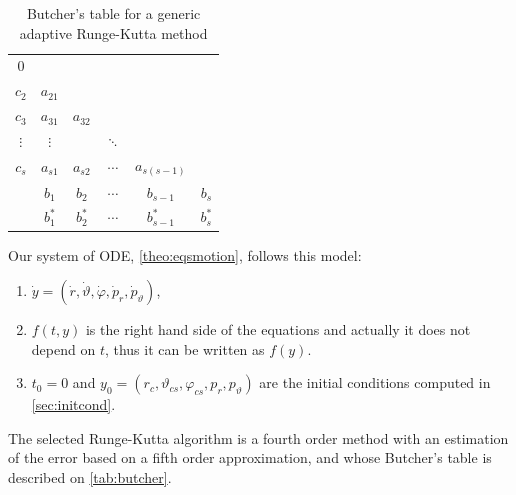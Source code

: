 \begin{table}[bth]
	\myfloatalign
	\begin{tabularx}{.54\textwidth}{c|ccccc}
		$0$&  & & & & \\
		$c_2$& $a_{21}$ & & & & \\
		$c_3$& $a_{31}$ & $a_{32}$ & & & \\
		$\vdots$& $\vdots$ &  & $\ddots$ & & \\
		$c_s$& $a_{s1}$  & $a_{s2}$ & $\cdots$ & $a_{s(s-1)}$ & \\ \hline
		& $b_1$ & $b_2$ & $\cdots$ & $b_{s-1}$ & $b_s$ \\ \hline
		& $b^*_1$ & $b^*_2$ & $\cdots$ & $b^*_{s-1}$ & $b^*_s$ \\
	\end{tabularx}
	\caption{Butcher's table for a generic adaptive Runge-Kutta method}
	\label{tab:generalbutcher}
\end{table}

Our system of \ac{ODE}, \autoref{theo:eqsmotion}, follows this model:
\begin{enumerate}
	\item $\dot{y} = (\dot{r}, \dot{\vartheta}, \dot{\varphi}, \dot{p}_r, \dot{p}_\vartheta)$,
	\item $f(t,y)$ is the right hand side of the equations and actually it does not depend on $t$, thus it can be written as $f(y)$.
	\item $t_0 = 0$ and $y_0 = (r_c, \vartheta_{cs}, \varphi_{cs}, p_{r}, p_{\vartheta})$ are the initial conditions computed in \autoref{sec:initcond}.
\end{enumerate}

The selected Runge-Kutta algorithm is a fourth order method with an estimation of the error based on a fifth order approximation, and whose Butcher's table is described on \autoref{tab:butcher}.

